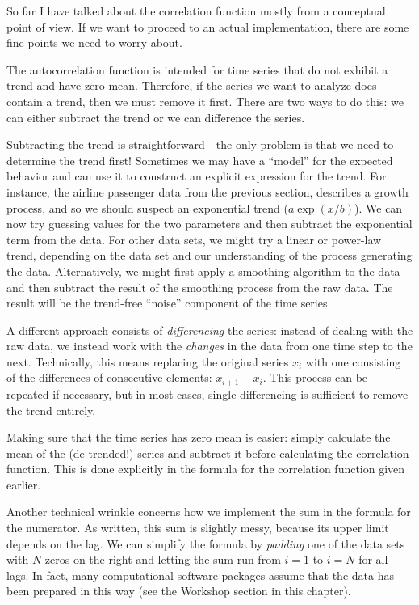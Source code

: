 So far I have talked about the correlation function mostly from a
conceptual point of view. If we want to proceed to an actual
implementation, there are some fine points we need to worry about.

The autocorrelation function  is intended for time series that do not
exhibit a trend  and have zero mean. Therefore, if the series we want
to analyze does contain a trend, then we must remove it first. There
are two ways to do this: we can either subtract the trend or we can
difference the series.

Subtracting the trend is straightforward---the only problem is that we
need to determine the trend first! Sometimes we may have a ``model''
for the expected behavior and can use it to construct an explicit
expression for the trend.  For instance, the airline passenger data
from the previous section, describes a growth process, and so we should
suspect an exponential trend ($a \exp(x/b)$).  We can now try guessing
values for the two parameters and then subtract the exponential term
from the data. For other data sets, we might try a linear or power-law
trend, depending on the data set and our understanding of the process
generating the data. Alternatively, we might first apply a smoothing
algorithm to the data and then subtract the result of the smoothing
process from the raw data. The result will be the trend-free ``noise''
component of the time series.

A different approach consists of \emph{differencing}  the series:
instead of dealing with the raw data, we instead work with the
\emph{changes} in the data from one time step to the next.
Technically, this means replacing the original series $x_i$ with one
consisting of the differences of consecutive elements: $x_{i+1} -
x_i$. This process can be repeated if necessary, but in most cases,
single differencing is sufficient to remove the trend entirely.

Making sure that the time series has zero mean is easier: simply
calculate the mean of the (de-trended!) series and subtract it before
calculating the correlation function.  This is done explicitly in the
formula for the correlation function  given earlier.

Another technical wrinkle concerns how we implement the sum in the
formula for the numerator. As written, this sum is slightly messy,
because its upper limit depends on the lag.  We can simplify the
formula by \emph{padding} one of the data sets with $N$ zeros on the
right and letting the sum run from $i=1$ to $i=N$ for all\vadjust{\pagebreak} lags. In
fact, many computational software packages assume that the data has
been prepared in this way (see the Workshop section in this chapter).

